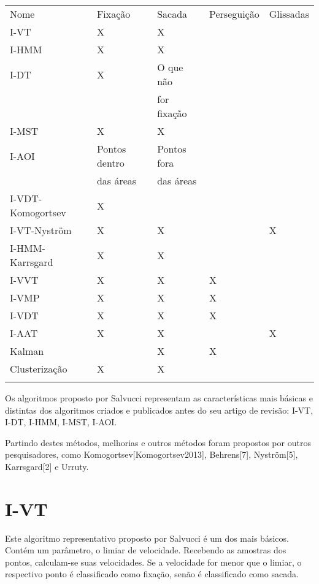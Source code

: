 \documentclass[brazil,]{report}
\begin{document}
\begin{longtable}[c]{@{}lllll@{}}
\hline\noalign{\medskip}
Nome & Fixação & Sacada & Perseguição & Glissadas
\\\noalign{\medskip}
\hline\noalign{\medskip}
I-VT & X & X & &
\\\noalign{\medskip}
I-HMM & X & X & &
\\\noalign{\medskip}
I-DT & X & O que não & &
\\\noalign{\medskip}
& & for fixação & &
\\\noalign{\medskip}
I-MST & X & X & &
\\\noalign{\medskip}
I-AOI & Pontos dentro & Pontos fora & &
\\\noalign{\medskip}
& das áreas & das áreas & &
\\\noalign{\medskip}
I-VDT-Komogortsev & X & & &
\\\noalign{\medskip}
I-VT-Nyström & X & X & & X
\\\noalign{\medskip}
I-HMM-Karrsgard & X & X & &
\\\noalign{\medskip}
I-VVT & X & X & X &
\\\noalign{\medskip}
I-VMP & X & X & X &
\\\noalign{\medskip}
I-VDT & X & X & X &
\\\noalign{\medskip}
I-AAT & X & X & & X
\\\noalign{\medskip}
Kalman & & X & X &
\\\noalign{\medskip}
Clusterização & X & X & &
\\\noalign{\medskip}
\hline
\end{longtable}

Os algoritmos proposto por Salvucci representam as características mais
básicas e distintas dos algoritmos criados e publicados antes do seu
artigo de revisão: \gls{I-VT}, \gls{I-DT}, \gls{I-HMM}, \gls{I-MST},
\gls{I-AOI}.

Partindo destes métodos, melhorias e outros métodos foram propostos por
outros pesquisadores, como Komogortsev{[}Komogortsev2013{]},
Behrens{[}7{]}, Nyström{[}5{]}, Karrsgard{[}2{]} e Urruty.

\section{\gls{I-VT}}\label{section}

Este algoritmo representativo proposto por Salvucci é um dos mais
básicos. Contém um parâmetro, o limiar de velocidade. Recebendo as
amostras dos pontos, calculam-se suas velocidades. Se a velocidade for
menor que o limiar, o respectivo ponto é classificado como fixação,
senão é classificado como sacada.
\end{document}
